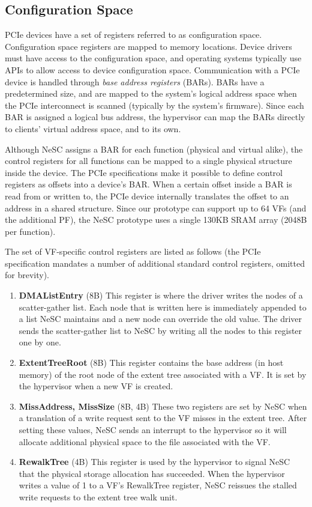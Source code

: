 \subsection*{Configuration Space}
PCIe devices have a set of registers referred to as configuration space. Configuration space registers are mapped to memory locations. Device drivers must have access to the configuration space, and operating systems typically use APIs to allow access to device configuration space.
Communication with a PCIe device is handled through \emph{base address registers} (BARs). BARs have a predetermined size, and are mapped to the system's logical address space when the PCIe interconnect is scanned (typically by the system's firmware). Since each BAR is assigned a logical bus address, the hypervisor can map the BARs directly to clients' virtual address space, and to its own.

Although NeSC assigns a BAR for each function (physical and virtual alike), the control registers for all functions can be mapped to a single physical structure inside the device.
The PCIe specifications make it possible to define control registers as offsets into a device's BAR. When a certain offset inside a BAR is read from or written to, the PCIe device internally translates the offset to an address in a shared structure.
Since our prototype can support up to 64 VFs (and the additional PF), the NeSC prototype uses a single 130KB SRAM array (2048B per function).

The set of VF-specific control registers are listed as follows (the PCIe specification mandates a number of additional standard control registers, omitted for brevity).
\begin{enumerate}
\item
  \textbf{DMAListEntry} (8B) \quad
  This register is where the driver writes the nodes of a scatter-gather list. Each node that is written here
  is immediately appended to a list NeSC maintains and a new node can override the old value. The driver sends the scatter-gather list to NeSC by writing all the nodes to this register one by one.

\item
  \textbf{ExtentTreeRoot} (8B)\quad
  This register contains the base address (in host memory) of the root node of the extent tree associated with a VF. It is set by the hypervisor when a new VF is created. 
%
\item
  \textbf{MissAddress, MissSize} (8B, 4B)\quad
  These two registers are set by NeSC when a translation of a write request sent to the VF misses in the extent tree. After setting these values, NeSC sends an interrupt to the hypervisor so it will allocate additional physical space to the file associated with the VF.
%
\item
  \textbf{RewalkTree} (4B)\quad
  This register is used by the hypervisor to signal NeSC that the physical storage allocation has succeeded. When the hypervisor writes a value of 1 to a VF's RewalkTree register, NeSC reissues the stalled write requests to the extent tree walk unit.
\end{enumerate}


